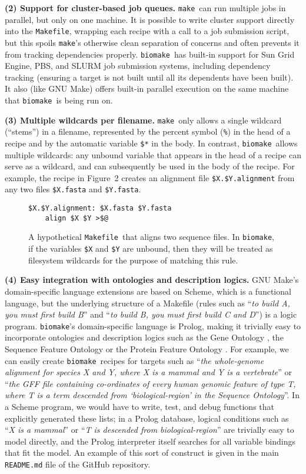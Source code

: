 \documentclass{bioinfo}
\newcommand\Makefile{{\tt Makefile}}
\newcommand\make{{\tt make}}
\newcommand\biomake{{\tt biomake}}
\begin{document}
{\bf (2) Support for cluster-based job queues.}
\make\ can run multiple jobs in parallel, but only on one machine.
It is possible to write cluster support directly into the \Makefile,
wrapping each recipe with a call to a job submission script,
but this spoils \make's otherwise clean separation of concerns
and often prevents it from tracking dependencies properly.
\biomake\ has built-in support for Sun Grid Engine, PBS, and SLURM job submission systems,
including dependency tracking (ensuring a target is not built until all its dependents have been built).
It also (like GNU Make) offers built-in parallel execution on
the same machine that \biomake\ is being run on.

{\bf (3) Multiple wildcards per filename.}
\make\ only allows a single wildcard (``stems'') in a filename,
represented by the percent symbol ({\tt \%}) in the head of a recipe and by the automatic variable {\tt \$*} in the body.
In contrast, \biomake\ allows multiple wildcards: any unbound variable that appears in the head of a recipe can serve as a wildcard,
and can subsequently be used in the body of the recipe.
For example, the recipe in Figure~2 creates an alignment file {\tt \$X.\$Y.alignment} from any two files {\tt \$X.fasta} and {\tt \$Y.fasta}.


\begin{figure}[H]
\begin{Verbatim}[frame=single]
$X.$Y.alignment: $X.fasta $Y.fasta
    align $X $Y >$@
\end{Verbatim}
\caption{
  A hypothetical \Makefile\ that aligns two sequence files.
  In \biomake, if the variables {\tt \$X} and {\tt \$Y} are unbound, then they will be treated as filesystem wildcards
  for the purpose of matching this rule.
}
\end{figure}

{\bf (4) Easy integration with ontologies and description logics.}
GNU Make's domain-specific language extensions are based on Scheme, which is a functional language,
but the underlying structure of a Makefile (rules such as ``{\em to build A, you must first build B}'' and ``{\em to build B, you must first build C and D}'')
is a logic program.
\biomake's domain-specific language is Prolog, making it trivially easy to incorporate ontologies and description logics
such as the Gene Ontology \citep{GeneOntology2000,GeneOntology2015}, the Sequence Feature Ontology \citep{SequenceOntology2005} or the Protein Feature Ontology \citep{ProteinFeatureOntology2008}.
For example, we can easily create \biomake\ recipes for targets such as ``{\em the whole-genome alignment for species X and Y, where X is a mammal and Y is a vertebrate}''
or ``{\em the GFF file containing co-ordinates of every human genomic feature of type T, where T is a term descended from `biological-region' in the Sequence Ontology}''.
In a Scheme program, we would have to write, test, and debug functions that explicitly generated these lists;
in a Prolog database, logical conditions such as ``{\em X is a mammal}'' or ``{\em T is descended from biological-region}'' are trivially easy to model directly,
and the Prolog interpreter itself searches for all variable bindings that fit the model.
An example of this sort of construct is given in the main {\tt README.md} file of the GitHub repository.
\end{document}
